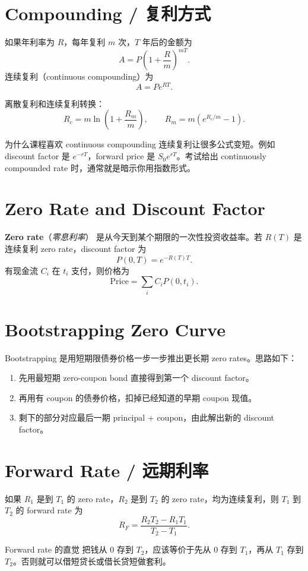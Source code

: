 \documentclass[11pt,a4paper,openany]{ctexbook}
\newcommand{\term}[2]{\textbf{#1}（\emph{#2}）}
\begin{document}
\section{Compounding / 复利方式}
如果年利率为 $R$，每年复利 $m$ 次，$T$ 年后的金额为
\[
A=P\left(1+\frac{R}{m}\right)^{mT}.
\]
连续复利（continuous compounding）为
\[
A=Pe^{RT}.
\]

离散复利和连续复利转换：
\[
R_c=m\ln\left(1+\frac{R_m}{m}\right),\qquad
R_m=m\left(e^{R_c/m}-1\right).
\]

\begin{intuitionbox}{为什么课程喜欢 continuous compounding}
连续复利让很多公式变短。例如 discount factor 是 $e^{-rT}$，forward price 是 $S_0e^{rT}$。考试给出 continuously compounded rate 时，通常就是暗示你用指数形式。
\end{intuitionbox}

\section{Zero Rate and Discount Factor}
\term{Zero rate}{零息利率} 是从今天到某个期限的一次性投资收益率。若 $R(T)$ 是连续复利 zero rate，discount factor 为
\[
P(0,T)=e^{-R(T)T}.
\]
有现金流 $C_i$ 在 $t_i$ 支付，则价格为
\[
\text{Price}=\sum_i C_iP(0,t_i).
\]

\section{Bootstrapping Zero Curve}
Bootstrapping 是用短期限债券价格一步一步推出更长期 zero rates。思路如下：
\begin{enumerate}
  \item 先用最短期 zero-coupon bond 直接得到第一个 discount factor。
  \item 再用有 coupon 的债券价格，扣掉已经知道的早期 coupon 现值。
  \item 剩下的部分对应最后一期 principal + coupon，由此解出新的 discount factor。
\end{enumerate}

\section{Forward Rate / 远期利率}
如果 $R_1$ 是到 $T_1$ 的 zero rate，$R_2$ 是到 $T_2$ 的 zero rate，均为连续复利，则 $T_1$ 到 $T_2$ 的 forward rate 为
\[
R_F=\frac{R_2T_2-R_1T_1}{T_2-T_1}.
\]

\begin{intuitionbox}{Forward rate 的直觉}
把钱从 0 存到 $T_2$，应该等价于先从 0 存到 $T_1$，再从 $T_1$ 存到 $T_2$。否则就可以借短贷长或借长贷短做套利。
\end{intuitionbox}
\end{document}
